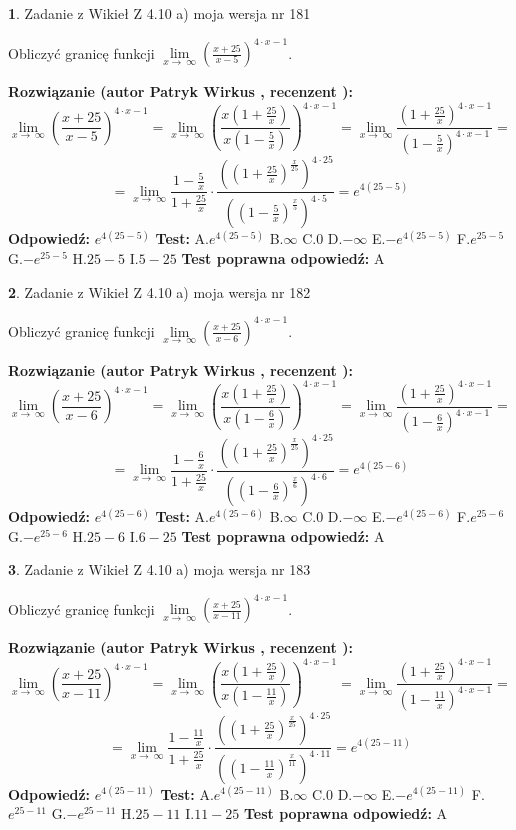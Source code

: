 \documentclass[12pt, a4paper]{article}
\theoremstyle{definition} %
\newtheorem{zad}{}
\newcommand{\zadStart}[1]{\begin{zad}#1\newline}
\newcommand{\zadStop}{\end{zad}}
\newcommand{\rozwStart}[2]{\noindent \textbf{Rozwiązanie (autor #1 , recenzent #2): }\newline}
\newcommand{\rozwStop}{\newline}
\newcommand{\odpStart}{\noindent \textbf{Odpowiedź:}\newline}
\newcommand{\odpStop}{\newline}
\newcommand{\testStart}{\noindent \textbf{Test:}\newline}
\newcommand{\testStop}{\newline}
\newcommand{\kluczStart}{\noindent \textbf{Test poprawna odpowiedź:}\newline}
\newcommand{\kluczStop}{\newline}
\begin{document}
\zadStart{Zadanie z Wikieł Z 4.10 a) moja wersja nr 181}


Obliczyć granicę funkcji  $\lim\limits_{x\to\ \infty}(\frac{x+25}{x-5})^{4\cdot x-1}$.
\zadStop
\rozwStart{Patryk Wirkus}{}
$$\lim\limits_{x\to\ \infty}(\frac{x+25}{x-5})^{4\cdot x-1} = \lim\limits_{x\to\ \infty}(\frac{x(1+\frac{25}{x})}{x(1-\frac{5}{x})})^{4\cdot x-1}=\lim\limits_{x\to\ \infty}\frac{(1+\frac{25}{x})^{4\cdot x-1}}{(1-\frac{5}{x})^{4\cdot x-1}}=$$
$$=\lim\limits_{x\to\ \infty}\frac{1-\frac{5}{x}}{1+\frac{25}{x}}\cdot\frac{((1+\frac{25}{x})^{\frac{x}{25}})^{4\cdot25}}{((1-\frac{5}{x})^{\frac{x}{5}})^{4\cdot5}}=e^{4(25-5)}$$
\rozwStop
\odpStart
$e^{4(25-5)}$
\odpStop
\testStart
A.$e^{4(25-5)}$ B.$\infty$ C.$0$ D.$-\infty$ E.$-e^{4(25-5)}$
F.$e^{25-5}$ G.$-e^{25-5}$
H.$25-5$
I.$5-25$
\testStop
\kluczStart
A
\kluczStop



\zadStart{Zadanie z Wikieł Z 4.10 a) moja wersja nr 182}


Obliczyć granicę funkcji  $\lim\limits_{x\to\ \infty}(\frac{x+25}{x-6})^{4\cdot x-1}$.
\zadStop
\rozwStart{Patryk Wirkus}{}
$$\lim\limits_{x\to\ \infty}(\frac{x+25}{x-6})^{4\cdot x-1} = \lim\limits_{x\to\ \infty}(\frac{x(1+\frac{25}{x})}{x(1-\frac{6}{x})})^{4\cdot x-1}=\lim\limits_{x\to\ \infty}\frac{(1+\frac{25}{x})^{4\cdot x-1}}{(1-\frac{6}{x})^{4\cdot x-1}}=$$
$$=\lim\limits_{x\to\ \infty}\frac{1-\frac{6}{x}}{1+\frac{25}{x}}\cdot\frac{((1+\frac{25}{x})^{\frac{x}{25}})^{4\cdot25}}{((1-\frac{6}{x})^{\frac{x}{6}})^{4\cdot6}}=e^{4(25-6)}$$
\rozwStop
\odpStart
$e^{4(25-6)}$
\odpStop
\testStart
A.$e^{4(25-6)}$ B.$\infty$ C.$0$ D.$-\infty$ E.$-e^{4(25-6)}$
F.$e^{25-6}$ G.$-e^{25-6}$
H.$25-6$
I.$6-25$
\testStop
\kluczStart
A
\kluczStop



\zadStart{Zadanie z Wikieł Z 4.10 a) moja wersja nr 183}


Obliczyć granicę funkcji  $\lim\limits_{x\to\ \infty}(\frac{x+25}{x-11})^{4\cdot x-1}$.
\zadStop
\rozwStart{Patryk Wirkus}{}
$$\lim\limits_{x\to\ \infty}(\frac{x+25}{x-11})^{4\cdot x-1} = \lim\limits_{x\to\ \infty}(\frac{x(1+\frac{25}{x})}{x(1-\frac{11}{x})})^{4\cdot x-1}=\lim\limits_{x\to\ \infty}\frac{(1+\frac{25}{x})^{4\cdot x-1}}{(1-\frac{11}{x})^{4\cdot x-1}}=$$
$$=\lim\limits_{x\to\ \infty}\frac{1-\frac{11}{x}}{1+\frac{25}{x}}\cdot\frac{((1+\frac{25}{x})^{\frac{x}{25}})^{4\cdot25}}{((1-\frac{11}{x})^{\frac{x}{11}})^{4\cdot11}}=e^{4(25-11)}$$
\rozwStop
\odpStart
$e^{4(25-11)}$
\odpStop
\testStart
A.$e^{4(25-11)}$ B.$\infty$ C.$0$ D.$-\infty$ E.$-e^{4(25-11)}$
F.$e^{25-11}$ G.$-e^{25-11}$
H.$25-11$
I.$11-25$
\testStop
\kluczStart
A
\kluczStop
\end{document}
